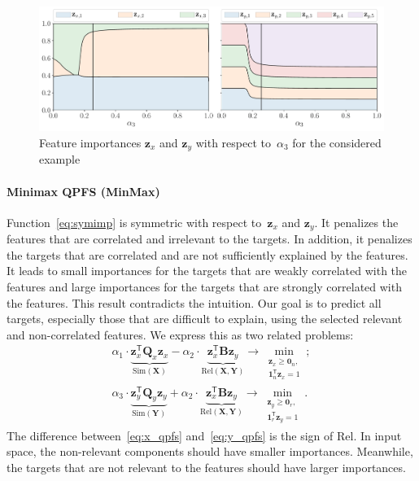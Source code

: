 \documentclass[preprint,authoryear,12pt]{elsarticle}
\theoremstyle{definition}
\newcommand{\bz}{\mathbf{z}}
\newcommand{\bY}{\mathbf{Y}}
\newcommand{\bX}{\mathbf{X}}
\newcommand{\bQ}{\mathbf{Q}}
\newcommand{\T}{\mathsf{T}}
\newcommand{\bOne}{\boldsymbol{1}}
\newcommand{\bZero}{\boldsymbol{0}}
\begin{document}
\begin{figure}
	\centering
	\includegraphics[width=\linewidth]{figs/features_vs_alpha.pdf}
	\caption{Feature importances $\bz_x$ and $\bz_y$ with respect to~$\alpha_3$ for the considered example}
	\label{fig:features_vs_alpha}
\end{figure}

\paragraph{Minimax QPFS (MinMax)}
Function~\eqref{eq:symimp} is symmetric with respect to~$\bz_x$ and $\bz_y$.
It penalizes the features that are correlated and irrelevant to the targets.
In addition, it penalizes the targets that are correlated and are not sufficiently explained by the features.
It leads to small importances for the targets that are weakly correlated with the features and large importances for the targets that are strongly correlated with the features.
This result contradicts the intuition.
Our goal is to predict all targets, especially those that are difficult to explain, using the selected relevant and non-correlated features. We express this as two related problems:
\begin{align}
\alpha_1 \cdot \underbrace{\bz_x^{\T} \bQ_x \bz_x}_{\text{Sim}(\bX)} - \alpha_2 \cdot \underbrace{ \bz_x^{\T}\mathbf{B} \bz_y}_{\text{Rel}(\bX, \bY)} \rightarrow \min_{\substack{\bz_x \geq \bZero_n, \\ \bOne_n^{\T}\bz_x=1}};
\label{eq:x_qpfs}\\
\alpha_3 \cdot \underbrace{\bz_y^{\T} \bQ_y \bz_y}_{\text{Sim}(\bY)} + \alpha_2 \cdot \underbrace{ \bz_x^{\T} \mathbf{B} \bz_y}_{\text{Rel}(\bX, \bY)} \rightarrow \min_{\substack{\bz_y \geq \bZero_r,  \\ \bOne_r^{\T}\bz_y=1}}.
\label{eq:y_qpfs}
\end{align}
The difference between~\eqref{eq:x_qpfs} and~\eqref{eq:y_qpfs} is the sign of Rel.
In input space, the non-relevant components should have smaller importances.
Meanwhile, the targets that are not relevant to the features should have larger importances.
\end{document}
